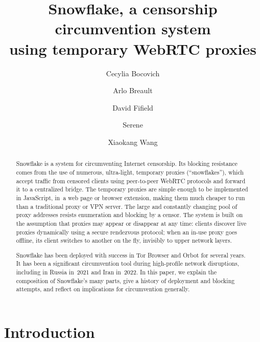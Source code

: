 \documentclass[letterpaper,twocolumn]{article}
\begin{document}
\date{}

\title{\Large\bf Snowflake, a censorship circumvention system\\using temporary WebRTC proxies}

\author{%
{\rm Cecylia Bocovich}%
\and
{\rm Arlo Breault}%
\and
{\rm David Fifield}%
\and
{\rm Serene}%
\and
{\rm Xiaokang Wang}%
}
\renewcommand{\maketitlehookc}{\centering\normalsize Authors are listed alphabetically.}

\maketitle

\begin{abstract}
Snowflake is a system for circumventing Internet censorship.
Its blocking resistance comes from
the use of numerous, ultra-light, temporary proxies (``snowflakes''),
which accept traffic from censored clients using peer-to-peer WebRTC protocols
and forward it to a centralized bridge.
The temporary proxies are simple enough to be implemented in JavaScript,
in~a web page or browser extension,
making them much cheaper to run than
a traditional proxy or VPN server.
The large and constantly changing pool
of proxy addresses resists enumeration and blocking by a censor.
The system is built on the assumption
that proxies may appear or disappear at any time:
clients discover live proxies dynamically
using a secure rendezvous protocol;
when an \mbox{in-use} proxy goes offline,
its client switches to another on the fly,
invisibly to upper network layers.

Snowflake has been deployed with success
in Tor Browser and Orbot for several years.
It has been a significant circumvention tool
during high-profile network disruptions,
including in Russia in~2021 and Iran in~2022.
In this paper, we explain the composition of Snowflake's many parts,
give a history of deployment and blocking attempts,
and reflect on implications for circumvention generally.
\end{abstract}


\section{Introduction}
\label{sec:intro}
\end{document}
